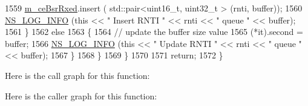 \begin{DoxyCode}
1559                                 \hyperlink{classns3_1_1MmWaveRrMacScheduler_a2ebec374f1ff5014f115ff8b68ff5ebb}{m\_ceBsrRxed}.insert ( std::pair<uint16\_t, uint32\_t > (rnti, 
      buffer));
1560                                 \hyperlink{group__logging_gafbd73ee2cf9f26b319f49086d8e860fb}{NS\_LOG\_INFO} (\textcolor{keyword}{this} << \textcolor{stringliteral}{" Insert RNTI "} << rnti << \textcolor{stringliteral}{" queue "} << 
      buffer);
1561                         \}
1562                         \textcolor{keywordflow}{else}
1563                         \{
1564                                 \textcolor{comment}{// update the buffer size value}
1565                                 (*it).second = buffer;
1566                                 \hyperlink{group__logging_gafbd73ee2cf9f26b319f49086d8e860fb}{NS\_LOG\_INFO} (\textcolor{keyword}{this} << \textcolor{stringliteral}{" Update RNTI "} << rnti << \textcolor{stringliteral}{" queue "} << 
      buffer);
1567                         \}
1568                 \}
1569         \}
1570 
1571         \textcolor{keywordflow}{return};
1572 \}
\end{DoxyCode}


Here is the call graph for this function\+:




Here is the caller graph for this function\+:


